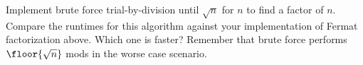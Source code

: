   Implement brute force trial-by-division until $\sqrt{n}$ for $n$
  to find a factor of $n$.
  Compare the runtimes for this algorithm
  against your implementation of Fermat factorization above.
  Which one is faster?
  Remember that brute force performs $\floor{\sqrt{n}}$ mods in the worse case scenario.
